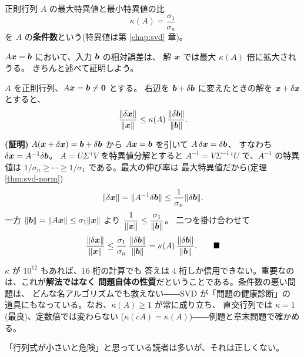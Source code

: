 \begin{teigi}[条件数]\label{def:num-cond}
正則行列 $A$ の最大特異値と最小特異値の比
\[
\kappa(A) = \frac{\sigma_1}{\sigma_n}
\]
を $A$ の\textbf{条件数}という(特異値は第 \ref{chap:svd} 章)。
\end{teigi}

$A\bm{x} = \bm{b}$ において、入力 $\bm{b}$ の相対誤差は、
解 $\bm{x}$ では最大 $\kappa(A)$ 倍に拡大されうる。
きちんと述べて証明しよう。

\begin{teiri}[誤差増幅の上限]\label{thm:num-cond}
$A$ を正則行列、$A\bm{x} = \bm{b} \neq \bm{0}$ とする。
右辺を $\bm{b} + \delta\bm{b}$ に変えたときの解を
$\bm{x} + \delta\bm{x}$ とすると、
\[
\frac{\|\delta\bm{x}\|}{\|\bm{x}\|}
\le \kappa(A)\,\frac{\|\delta\bm{b}\|}{\|\bm{b}\|}.
\]
\end{teiri}

\noindent\textbf{(証明)}\quad
$A(\bm{x} + \delta\bm{x}) = \bm{b} + \delta\bm{b}$ から
$A\bm{x} = \bm{b}$ を引いて $A\,\delta\bm{x} = \delta\bm{b}$、
すなわち $\delta\bm{x} = A^{-1}\delta\bm{b}$。
$A = U\Sigma\,{}^tV$ を特異値分解とすると
$A^{-1} = V\Sigma^{-1}\,{}^tU$ で、$A^{-1}$ の特異値は
$1/\sigma_n \ge \cdots \ge 1/\sigma_1$ である。最大の伸び率は
最大特異値だから(定理 \ref{thm:svd-norm})
\[
\|\delta\bm{x}\| = \|A^{-1}\delta\bm{b}\|
\le \frac{1}{\sigma_n}\|\delta\bm{b}\|.
\]
一方 $\|\bm{b}\| = \|A\bm{x}\| \le \sigma_1\|\bm{x}\|$ より
$\dfrac{1}{\|\bm{x}\|} \le \dfrac{\sigma_1}{\|\bm{b}\|}$。
二つを掛け合わせて
\[
\frac{\|\delta\bm{x}\|}{\|\bm{x}\|}
\le \frac{\sigma_1}{\sigma_n}\,\frac{\|\delta\bm{b}\|}{\|\bm{b}\|}
= \kappa(A)\,\frac{\|\delta\bm{b}\|}{\|\bm{b}\|}. \qquad\blacksquare
\]

$\kappa$ が $10^{12}$ もあれば、$16$ 桁の計算でも
答えは $4$ 桁しか信用できない。重要なのは、これが\textbf{解法ではなく
問題自体の性質}だということである。条件数の悪い問題は、
どんな名アルゴリズムでも救えない――SVD が「問題の健康診断」の
道具にもなっている。なお、$\kappa(A) \ge 1$ が常に成り立ち、
直交行列では $\kappa = 1$(最良)、定数倍では変わらない
($\kappa(cA) = \kappa(A)$)――例題と章末問題で確かめる。

「行列式が小さいと危険」と思っている読者は多いが、それは正しくない。

